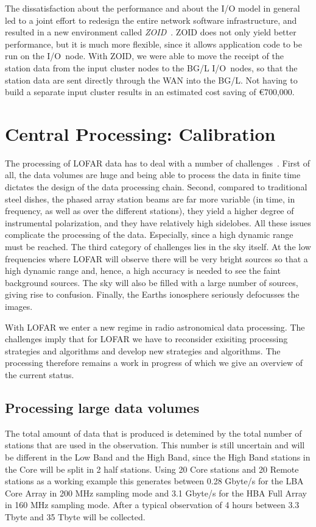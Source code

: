 \documentclass[journal]{IEEEtran}
\begin{document}
The dissatisfaction about the performance and about the I/O model in general
led to a joint effort to redesign the entire network software infrastructure,
and resulted in a new environment called {\em ZOID\/}~\cite{Iskra:08}.
ZOID does not only yield better performance, but it is much more flexible,
since it allows application code to be run on the I/O~node.
With ZOID, we were able to move the receipt of the station data from the input
cluster nodes to the BG/L I/O~nodes, so that the station data are sent
directly through the WAN into the BG/L.
Not having to build a separate input cluster results in an estimated cost
saving of \euro700,000.

\section{Central Processing: Calibration}

The processing of LOFAR data has to deal with a number of challenges~\cite{Noordam:04,Nijboer:07}. First of all, the data volumes are huge and being able to process the data in finite time dictates the design of the data processing chain. Second, compared to traditional steel dishes, the phased array station beams are far more variable (in time, in frequency, as well as over the different stations), they yield a higher degree of instrumental polarization, and they have relatively high sidelobes. All these issues complicate the processing of the data. Especially, since a high dynamic range must be reached. The third category of challenges lies in the sky itself. At the low frequencies where LOFAR will observe there will be very bright sources so that a high dynamic range and, hence, a high accuracy is needed to see the faint background sources. The sky will also be filled with a large number of sources, giving rise to confusion. Finally, the Earths ionosphere seriously defocusses the images.

With LOFAR we enter a new regime in radio astronomical data processing.  The challenges imply that for LOFAR we have to reconsider exisiting processing strategies and algorithms and develop new strategies and algorithms. The processing therefore remains a work in progress of which we give an overview of the current status.

\subsection{Processing large data volumes}

The total amount of data that is produced is detemined by the total number of stations that are used in the observation. This number is still uncertain and will be different in the Low Band and the High Band, since the High Band stations in the Core will be split in 2 half stations. Using 20 Core stations and 20 Remote stations as a working example this generates between 0.28 Gbyte/s for the LBA Core Array in 200 MHz sampling mode and 3.1 Gbyte/s for the HBA Full Array in 160 MHz sampling mode. After a typical observation of 4 hours between 3.3 Tbyte and 35 Tbyte will be collected.
\end{document}

